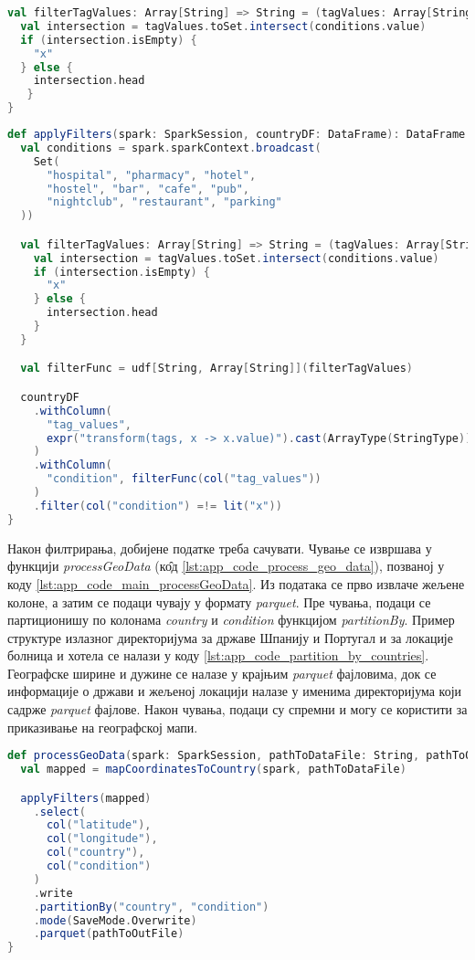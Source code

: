\documentclass[12pt,oneside]{memoir}
\begin{document}
\begin{lstlisting}[caption={Функција која одређује да ли је локација жељеног типа}, language=Scala, label={lst:app_code_filter_tag_vals_func}]
val filterTagValues: Array[String] => String = (tagValues: Array[String]) => {
  val intersection = tagValues.toSet.intersect(conditions.value)
  if (intersection.isEmpty) {
    "x"
  } else {
    intersection.head
   }
}
\end{lstlisting}

\begin{lstlisting}[caption={Функција \textit{applyFilters}}, language=Scala, label={lst:app_code_apply_filters}]
def applyFilters(spark: SparkSession, countryDF: DataFrame): DataFrame = {
  val conditions = spark.sparkContext.broadcast(
    Set(
      "hospital", "pharmacy", "hotel",
      "hostel", "bar", "cafe", "pub",
      "nightclub", "restaurant", "parking"
  ))

  val filterTagValues: Array[String] => String = (tagValues: Array[String]) => {
    val intersection = tagValues.toSet.intersect(conditions.value)
    if (intersection.isEmpty) {
      "x"
    } else {
      intersection.head
    }
  }

  val filterFunc = udf[String, Array[String]](filterTagValues)

  countryDF
    .withColumn(
      "tag_values",
      expr("transform(tags, x -> x.value)").cast(ArrayType(StringType))
    )
    .withColumn(
      "condition", filterFunc(col("tag_values"))
    )
    .filter(col("condition") =!= lit("x"))
}
\end{lstlisting}

Након филтрирања, добијене податке треба сачувати. Чување се извршава у функцији \textit{processGeoData} (к\^{о}д \ref{lst:app_code_process_geo_data}), позваној у коду \ref{lst:app_code_main_processGeoData}. Из података се прво извлаче жељене колоне, а затим се подаци чувају у формату \textit{parquet}. Пре чувања, подаци се партиционишу по колонама \textit{country} и \textit{condition} функцијом \textit{partitionBy}. Пример структуре излазног директоријума за државе Шпанију и Португал и за локације болница и хотела се налази у коду \ref{lst:app_code_partition_by_countries}. Географске ширине и дужине се налазе у крајњим \textit{parquet} фајловима, док се информације о држави и жељеној локацији налазе у именима директоријума који садрже \textit{parquet} фајлове. Након чувања, подаци су спремни и могу се користити за приказивање на географској мапи.

\begin{lstlisting}[caption={Функција \textit{processGeoData}}, language=Scala, label={lst:app_code_process_geo_data}]
def processGeoData(spark: SparkSession, pathToDataFile: String, pathToOutFile: String): Unit = {
  val mapped = mapCoordinatesToCountry(spark, pathToDataFile)

  applyFilters(mapped)
    .select(
      col("latitude"),
      col("longitude"),
      col("country"),
      col("condition")
    )
    .write
    .partitionBy("country", "condition")
    .mode(SaveMode.Overwrite)
    .parquet(pathToOutFile)
}
\end{lstlisting}
\end{document}
